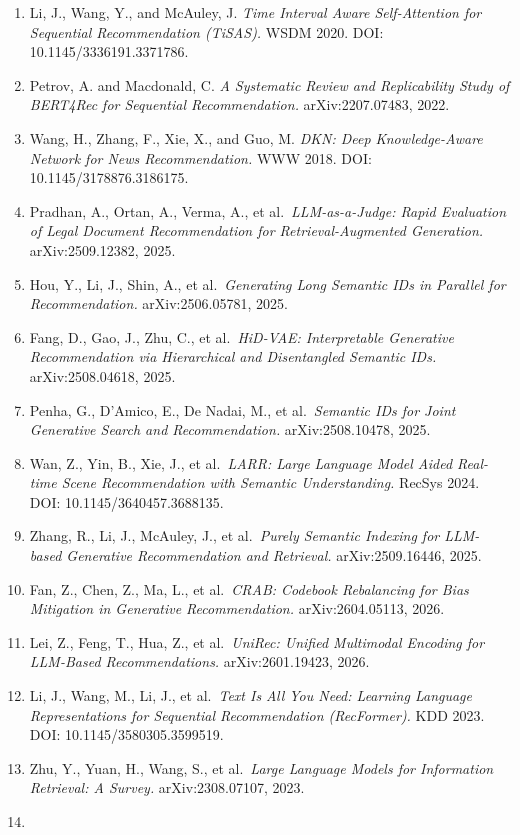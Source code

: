 \begin{enumerate}
\item
  Li, J., Wang, Y., and McAuley, J. \emph{Time Interval Aware Self-Attention for Sequential Recommendation (TiSAS).} WSDM 2020. DOI: 10.1145/3336191.3371786.
\item
  Petrov, A. and Macdonald, C. \emph{A Systematic Review and Replicability Study of BERT4Rec for Sequential Recommendation.} arXiv:2207.07483, 2022.
\item
  Wang, H., Zhang, F., Xie, X., and Guo, M. \emph{DKN: Deep Knowledge-Aware Network for News Recommendation.} WWW 2018. DOI: 10.1145/3178876.3186175.
\item
  Pradhan, A., Ortan, A., Verma, A., et al.~\emph{LLM-as-a-Judge: Rapid Evaluation of Legal Document Recommendation for Retrieval-Augmented Generation.} arXiv:2509.12382, 2025.
\item
  Hou, Y., Li, J., Shin, A., et al.~\emph{Generating Long Semantic IDs in Parallel for Recommendation.} arXiv:2506.05781, 2025.
\item
  Fang, D., Gao, J., Zhu, C., et al.~\emph{HiD-VAE: Interpretable Generative Recommendation via Hierarchical and Disentangled Semantic IDs.} arXiv:2508.04618, 2025.
\item
  Penha, G., D'Amico, E., De Nadai, M., et al.~\emph{Semantic IDs for Joint Generative Search and Recommendation.} arXiv:2508.10478, 2025.
\item
  Wan, Z., Yin, B., Xie, J., et al.~\emph{LARR: Large Language Model Aided Real-time Scene Recommendation with Semantic Understanding.} RecSys 2024. DOI: 10.1145/3640457.3688135.
\item
  Zhang, R., Li, J., McAuley, J., et al.~\emph{Purely Semantic Indexing for LLM-based Generative Recommendation and Retrieval.} arXiv:2509.16446, 2025.
\item
  Fan, Z., Chen, Z., Ma, L., et al.~\emph{CRAB: Codebook Rebalancing for Bias Mitigation in Generative Recommendation.} arXiv:2604.05113, 2026.
\item
  Lei, Z., Feng, T., Hua, Z., et al.~\emph{UniRec: Unified Multimodal Encoding for LLM-Based Recommendations.} arXiv:2601.19423, 2026.
\item
  Li, J., Wang, M., Li, J., et al.~\emph{Text Is All You Need: Learning Language Representations for Sequential Recommendation (RecFormer).} KDD 2023. DOI: 10.1145/3580305.3599519.
\item
  Zhu, Y., Yuan, H., Wang, S., et al.~\emph{Large Language Models for Information Retrieval: A Survey.} arXiv:2308.07107, 2023.
\item

\end{enumerate}

